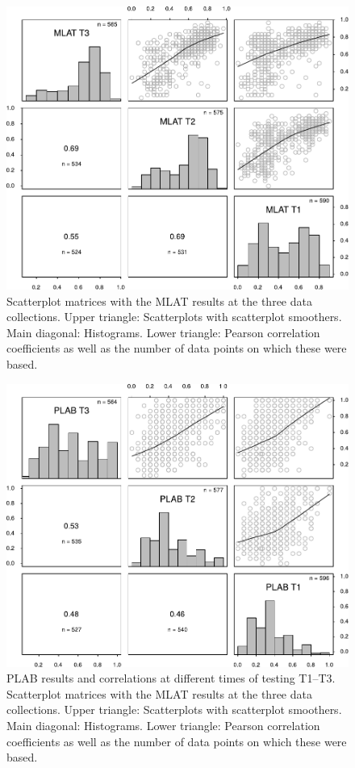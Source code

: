 \documentclass[output=paper]{langsci/langscibook}
\begin{document}
   
\begin{figure}
\includegraphics[width=\textwidth]{figures/figure10.1.pdf}
\caption{\label{fig:10:1} Scatterplot matrices with the MLAT results at the three data collections. Upper triangle: Scatterplots with scatterplot smoothers. Main diagonal: Histograms. Lower triangle: Pearson correlation coefficients as well as the number of data points on which these were based.}
\end{figure}

  
\begin{figure}
\includegraphics[width=\textwidth]{figures/figure10.2.pdf}
\caption{\label{fig:10:2}PLAB results and correlations at different times of testing T1--T3. Scatterplot matrices with the MLAT results at the three data collections. Upper triangle: Scatterplots with scatterplot smoothers. Main diagonal: Histograms. Lower triangle: Pearson correlation coefficients as well as the number of data points on which these were based.}
\end{figure}
\end{document}
